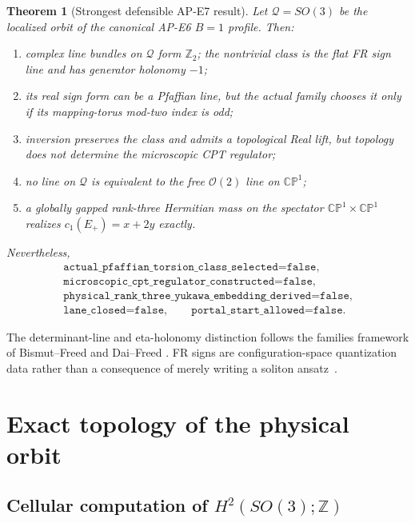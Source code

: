 \documentclass[11pt]{article}
\newtheorem{theorem}{Theorem}[section]
\theoremstyle{definition}
\theoremstyle{remark}
\newcommand{\ZZ}{\mathbb Z}
\newcommand{\CP}{\mathbb {CP}}
\newcommand{\cO}{\mathcal O}
\newcommand{\cQ}{\mathcal Q}
\begin{document}
\begin{theorem}[Strongest defensible AP-E7 result]
Let \(\cQ=SO(3)\) be the localized orbit of the canonical AP-E6 \(B=1\)
profile.  Then:
\begin{enumerate}[label=(\alph*)]
\item complex line bundles on \(\cQ\) form \(\ZZ_2\); the nontrivial class is
  the flat FR sign line and has generator holonomy \(-1\);
\item its real sign form can be a Pfaffian line, but the actual family chooses
  it only if its mapping-torus mod-two index is odd;
\item inversion preserves the class and admits a topological Real lift, but
  topology does not determine the microscopic CPT regulator;
\item no line on \(\cQ\) is equivalent to the free \(\cO(2)\) line on
  \(\CP^1\);
\item a globally gapped rank-three Hermitian mass on the spectator
  \(\CP^1\times\CP^1\) realizes \(c_1(E_+)=x+2y\) exactly.
\end{enumerate}
Nevertheless,
\[
\begin{gathered}
\texttt{actual\_pfaffian\_torsion\_class\_selected=false},\\
\texttt{microscopic\_cpt\_regulator\_constructed=false},\\
\texttt{physical\_rank\_three\_yukawa\_embedding\_derived=false},\\
\texttt{lane\_closed=false},\qquad
\texttt{portal\_start\_allowed=false}.
\end{gathered}
\]
\end{theorem}

The determinant-line and eta-holonomy distinction follows the families
framework of Bismut--Freed and Dai--Freed
\cite{BismutFreed1986APE7,DaiFreed1994APE7}.  FR signs are configuration-space
quantization data rather than a consequence of merely writing a soliton
ansatz~\cite{FinkelsteinRubinstein1968APE7,Krusch2003APE7}.

\section{Exact topology of the physical orbit}

\subsection{Cellular computation of \texorpdfstring{\(H^2(SO(3);\ZZ)\)}{H2(SO(3);Z)}}
\end{document}

